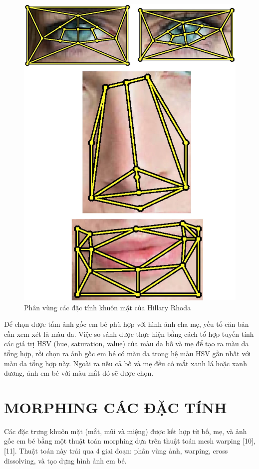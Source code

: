 \documentclass[journal]{IEEEtran}
\begin{document}
\begin{figure}[!t]
\centering
\includegraphics{Images/17}
\caption{Phân vùng các đặc tính khuôn mặt của Hillary Rhoda}
\label{refhinh9}
\end{figure}

Để chọn được tấm ảnh gốc em bé phù hợp với hình ảnh cha mẹ, yếu tố căn bản cần xem xét là màu da. Việc so sánh được thực hiện bằng cách tổ hợp tuyến tính các giá trị HSV (hue, saturation, value) của màu da bố và mẹ để tạo ra màu da tổng hợp, rồi chọn ra ảnh gốc em bé có màu da trong hệ màu HSV gần nhất với màu da tổng hợp này. Ngoài ra nếu cả bố và mẹ đều có mắt xanh lá hoặc xanh dương, ảnh em bé với màu mắt đó sẽ được chọn.

\section{MORPHING CÁC ĐẶC TÍNH}
Các đặc trưng khuôn mặt (mắt, mũi và miệng) được kết hợp từ bố, mẹ, và ảnh gốc em bé bằng một thuật toán morphing dựa trên thuật toán mesh warping [10], [11]. Thuật toán này trải qua 4 giai đoạn: phân vùng ảnh, warping, cross dissolving, và tạo dựng hình ảnh em bé.
\end{document}
